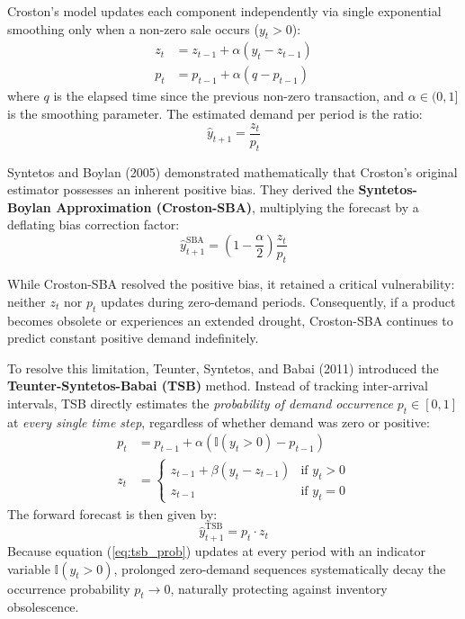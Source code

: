 \documentclass[12pt,a4paper,oneside]{report}
\theoremstyle{definition}
\begin{document}
Croston's model updates each component independently via single exponential smoothing only when a non-zero sale occurs ($y_t > 0$):
\begin{align}
z_t &= z_{t-1} + \alpha (y_t - z_{t-1}) \\
p_t &= p_{t-1} + \alpha (q - p_{t-1})
\end{align}
where $q$ is the elapsed time since the previous non-zero transaction, and $\alpha \in (0, 1]$ is the smoothing parameter. The estimated demand per period is the ratio:
\begin{equation}
\hat{y}_{t+1} = \frac{z_t}{p_t}
\end{equation}

Syntetos and Boylan (2005) demonstrated mathematically that Croston's original estimator possesses an inherent positive bias. They derived the \textbf{Syntetos-Boylan Approximation (Croston-SBA)}, multiplying the forecast by a deflating bias correction factor:
\begin{equation}
\hat{y}_{t+1}^{\text{SBA}} = \left(1 - \frac{\alpha}{2}\right) \frac{z_t}{p_t}
\end{equation}

While Croston-SBA resolved the positive bias, it retained a critical vulnerability: neither $z_t$ nor $p_t$ updates during zero-demand periods. Consequently, if a product becomes obsolete or experiences an extended drought, Croston-SBA continues to predict constant positive demand indefinitely. 

To resolve this limitation, Teunter, Syntetos, and Babai (2011) introduced the \textbf{Teunter-Syntetos-Babai (TSB)} method. Instead of tracking inter-arrival intervals, TSB directly estimates the \textit{probability of demand occurrence} $p_t \in [0, 1]$ at \textit{every single time step}, regardless of whether demand was zero or positive:
\begin{align}
p_t &= p_{t-1} + \alpha \left( \mathbb{I}(y_t > 0) - p_{t-1} \right) \label{eq:tsb_prob} \\
z_t &= \begin{cases} 
z_{t-1} + \beta (y_t - z_{t-1}) & \text{if } y_t > 0 \\
z_{t-1} & \text{if } y_t = 0 
\end{cases} \label{eq:tsb_size}
\end{align}
The forward forecast is then given by:
\begin{equation}
\hat{y}_{t+1}^{\text{TSB}} = p_t \cdot z_t
\end{equation}
Because equation (\ref{eq:tsb_prob}) updates at every period with an indicator variable $\mathbb{I}(y_t > 0)$, prolonged zero-demand sequences systematically decay the occurrence probability $p_t \to 0$, naturally protecting against inventory obsolescence.
\end{document}
